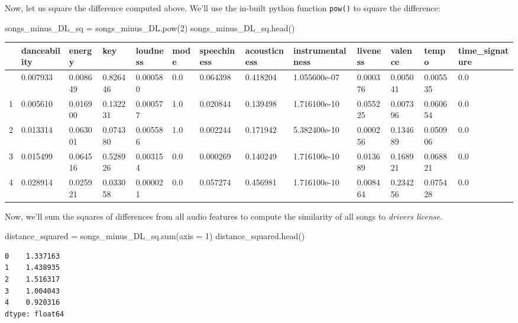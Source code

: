 \documentclass[
  letterpaper,
  DIV=11,
  numbers=noendperiod]{scrreprt}
\newenvironment{Shaded}{\begin{snugshade}}{\end{snugshade}}
\newcommand{\BuiltInTok}[1]{\textcolor[rgb]{0.00,0.23,0.31}{#1}}
\newcommand{\DecValTok}[1]{\textcolor[rgb]{0.68,0.00,0.00}{#1}}
\newcommand{\NormalTok}[1]{\textcolor[rgb]{0.00,0.23,0.31}{#1}}
\newcommand{\OperatorTok}[1]{\textcolor[rgb]{0.37,0.37,0.37}{#1}}
\begin{document}
Now, let us square the difference computed above. We'll use the in-built
python function \texttt{pow()} to square the difference:

\begin{Shaded}
\begin{Highlighting}[]
\NormalTok{songs\_minus\_DL\_sq }\OperatorTok{=}\NormalTok{ songs\_minus\_DL.}\BuiltInTok{pow}\NormalTok{(}\DecValTok{2}\NormalTok{)}
\NormalTok{songs\_minus\_DL\_sq.head()}
\end{Highlighting}
\end{Shaded}

\begin{longtable}[]{@{}lllllllllllll@{}}
\toprule\noalign{}
& danceability & energy & key & loudness & mode & speechiness &
acousticness & instrumentalness & liveness & valence & tempo &
time\_signature \\
\midrule\noalign{}
\endhead
\bottomrule\noalign{}
\endlastfoot
0 & 0.007933 & 0.008649 & 0.826446 & 0.000580 & 0.0 & 0.064398 &
0.418204 & 1.055600e-07 & 0.000376 & 0.005041 & 0.005535 & 0.0 \\
1 & 0.005610 & 0.016900 & 0.132231 & 0.000577 & 1.0 & 0.020844 &
0.139498 & 1.716100e-10 & 0.055225 & 0.007396 & 0.060654 & 0.0 \\
2 & 0.013314 & 0.063001 & 0.074380 & 0.005586 & 1.0 & 0.002244 &
0.171942 & 5.382400e-10 & 0.000256 & 0.134689 & 0.050906 & 0.0 \\
3 & 0.015499 & 0.064516 & 0.528926 & 0.003154 & 0.0 & 0.000269 &
0.140249 & 1.716100e-10 & 0.013689 & 0.168921 & 0.068821 & 0.0 \\
4 & 0.028914 & 0.025921 & 0.033058 & 0.000021 & 0.0 & 0.057274 &
0.456981 & 1.716100e-10 & 0.008464 & 0.234256 & 0.075428 & 0.0 \\
\end{longtable}

Now, we'll sum the squares of differences from all audio features to
compute the similarity of all songs to \emph{drivers license}.

\begin{Shaded}
\begin{Highlighting}[]
\NormalTok{distance\_squared }\OperatorTok{=}\NormalTok{ songs\_minus\_DL\_sq.}\BuiltInTok{sum}\NormalTok{(axis }\OperatorTok{=} \DecValTok{1}\NormalTok{)}
\NormalTok{distance\_squared.head()}
\end{Highlighting}
\end{Shaded}

\begin{verbatim}
0    1.337163
1    1.438935
2    1.516317
3    1.004043
4    0.920316
dtype: float64
\end{verbatim}
\end{document}
